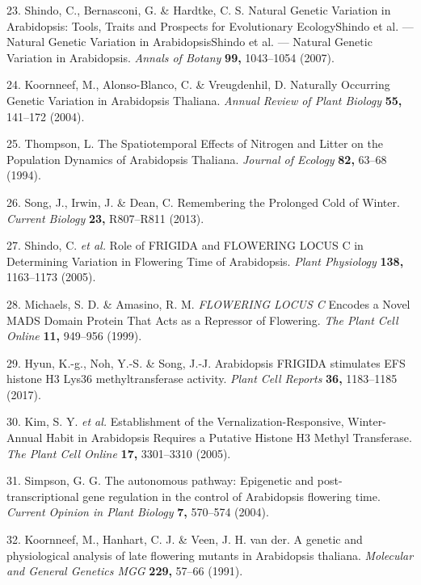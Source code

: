 \documentclass[12pt,]{book}
\begin{document}
\hypertarget{ref-shindo_natural_2007}{}
23. Shindo, C., Bernasconi, G. \& Hardtke, C. S. Natural Genetic
Variation in Arabidopsis: Tools, Traits and Prospects for Evolutionary
EcologyShindo et al. --- Natural Genetic Variation in ArabidopsisShindo
et al. --- Natural Genetic Variation in Arabidopsis. \emph{Annals of
Botany} \textbf{99,} 1043--1054 (2007).

\hypertarget{ref-koornneef_naturally_2004}{}
24. Koornneef, M., Alonso-Blanco, C. \& Vreugdenhil, D. Naturally
Occurring Genetic Variation in Arabidopsis Thaliana. \emph{Annual Review
of Plant Biology} \textbf{55,} 141--172 (2004).

\hypertarget{ref-thompson_spatiotemporal_1994}{}
25. Thompson, L. The Spatiotemporal Effects of Nitrogen and Litter on
the Population Dynamics of Arabidopsis Thaliana. \emph{Journal of
Ecology} \textbf{82,} 63--68 (1994).

\hypertarget{ref-song_remembering_2013}{}
26. Song, J., Irwin, J. \& Dean, C. Remembering the Prolonged Cold of
Winter. \emph{Current Biology} \textbf{23,} R807--R811 (2013).

\hypertarget{ref-shindo_role_2005}{}
27. Shindo, C. \emph{et al.} Role of FRIGIDA and FLOWERING LOCUS C in
Determining Variation in Flowering Time of Arabidopsis. \emph{Plant
Physiology} \textbf{138,} 1163--1173 (2005).

\hypertarget{ref-michaels_flowering_1999}{}
28. Michaels, S. D. \& Amasino, R. M. \emph{FLOWERING LOCUS C} Encodes a
Novel MADS Domain Protein That Acts as a Repressor of Flowering.
\emph{The Plant Cell Online} \textbf{11,} 949--956 (1999).

\hypertarget{ref-hyun_arabidopsis_2017}{}
29. Hyun, K.-g., Noh, Y.-S. \& Song, J.-J. Arabidopsis FRIGIDA
stimulates EFS histone H3 Lys36 methyltransferase activity. \emph{Plant
Cell Reports} \textbf{36,} 1183--1185 (2017).

\hypertarget{ref-kim_establishment_2005}{}
30. Kim, S. Y. \emph{et al.} Establishment of the
Vernalization-Responsive, Winter-Annual Habit in Arabidopsis Requires a
Putative Histone H3 Methyl Transferase. \emph{The Plant Cell Online}
\textbf{17,} 3301--3310 (2005).

\hypertarget{ref-simpson_autonomous_2004}{}
31. Simpson, G. G. The autonomous pathway: Epigenetic and
post-transcriptional gene regulation in the control of Arabidopsis
flowering time. \emph{Current Opinion in Plant Biology} \textbf{7,}
570--574 (2004).

\hypertarget{ref-koornneef_genetic_1991}{}
32. Koornneef, M., Hanhart, C. J. \& Veen, J. H. van der. A genetic and
physiological analysis of late flowering mutants in Arabidopsis
thaliana. \emph{Molecular and General Genetics MGG} \textbf{229,} 57--66
(1991).
\end{document}
